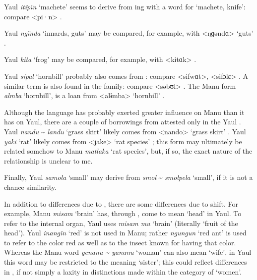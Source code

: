 Yaul \textit{itïpïn} ‘machete’ seems to derive from ing with a  word for ‘machete, knife’: compare  <pi·n> \citep[5044]{Laycock1971b}.

Yaul \textit{ngïnda} ‘innards, guts’ may be compared, for example, with  <ŋɡəndɑ> ‘guts’ \citep[3128]{Laycock1971a}.

Yaul \textit{kita} ‘frog’ may be compared, for example, with  <kitɑk> \citep[5040]{Laycock1971b}.

Yaul \textit{sipal} ‘hornbill’ probably also comes from : compare  <sifwɑt>,  <sifɔlɛ> \citep[3194]{Laycock1971b}. A similar term is also found in the  family: compare  <səbʊl> \citep[4982]{Laycock1971b}. The Manu form \textit{almba} ‘hornbill’, is a loan from  <alɨmba> ‘hornbill’ \citep[75]{Barlow2021}.

  Although the  language has probably exerted greater influence on Manu than it has on Yaul, there are a couple of borrowings from  attested only in the Yaul . Yaul \textit{nandu} {\textasciitilde} \textit{landu} ‘grass skirt’ likely comes from  <nando> ‘grass skirt’ \citep[80]{Barlow2021}. Yaul \textit{yaki} ‘rat’ likely comes from \linebreak {} <jake> ‘rat species’ \citep[76]{Barlow2021}; this  form may ultimately be related somehow to Manu \textit{matlaka} ‘rat species’, but, if so, the exact nature of the relationship is unclear to me.
  
  Finally, Yaul \textit{samola} ‘small’ may derive from  \textit{smol} {\textasciitilde} \textit{smolpela} ‘small’, if it is not a chance similarity.



  In addition to  differences due to , there are some differences due to   shift. For example, Manu \textit{misam} ‘brain’ has, through , come to mean ‘head’ in Yaul. To refer to the internal organ, Yaul uses \textit{misam mu} ‘brain’ (literally ‘fruit of the head’). Yaul \textit{inangïn} ‘red’ is not used in Manu; rather \textit{ngungun} ‘red ant’ is used to refer to the color red as well as to the insect known for having that color. Whereas the Manu word \textit{yenanu {\textasciitilde} yananu} ‘woman’ can also mean ‘wife’, in Yaul this word may be restricted to the meaning ‘sister’; this could reflect differences in , if not simply a laxity in distinctions made within the  category of ‘women’.

